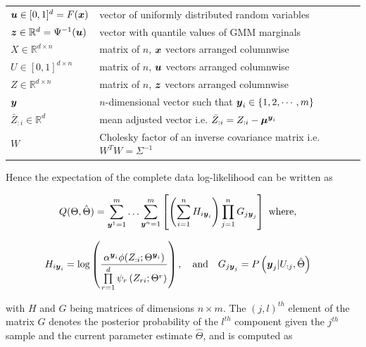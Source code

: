 \documentclass{article}
\begin{document}
\begin{table}[h]
\begin{tabular}{ll}
$\boldsymbol{u} \in [0,1]^d=F(\boldsymbol{x})$ &  vector of uniformly distributed random variables \\

$\boldsymbol{z} \in \mathbb{R}^d =\Psi^{-1}(\boldsymbol{u}) $ &  vector with quantile values of GMM marginals \\

$X \in \mathbb{R}^{d \times n}$ & matrix of $n$, $\boldsymbol{x}$ vectors arranged columnwise \\

$U \in [0,1]^{d \times n}$ & matrix of $n$, $\boldsymbol{u}$ vectors arranged columnwise \\

$Z \in \mathbb{R}^{d \times n}$ & matrix of $n$, $\boldsymbol{z}$ vectors arranged columnwise \\

$\boldsymbol{y}$ & $n$-dimensional vector such that $\boldsymbol{y}_i \in \{1,2,\cdots,m\}$ \\

$\bar{Z}_{:i} \in \mathbb{R}^d$ & mean adjusted vector i.e. $\bar{Z}_{:i} = Z_{:i} - \boldsymbol{\mu}^{\boldsymbol{y}_i}$ \\

$W $ & Cholesky factor of an inverse covariance matrix i.e. $W^TW=\Sigma^{-1}$ \\

 \hline

\end{tabular}

\end{table}

Hence the expectation of the complete data log-likelihood can be written as

\begin{align} \label{eq:ll_comp_expectation}
Q(\Theta,\hat{\Theta})&=\sum\limits_{\boldsymbol{y}^1=1}^m \ldots \sum\limits_{\boldsymbol{y}^n=1}^m \left[ \left( \sum\limits_{i=1}^{n}H_{i\boldsymbol{y}_i}  \right) \prod\limits_{j=1}^{n}G_{j\boldsymbol{y}_j} \right] \text{  where,}
\end{align}

\begin{align}
H_{i\boldsymbol{y}_i} &= \log \left(\frac{\alpha^{\boldsymbol{y}_i}\phi(Z_{:i}; \Theta^{\boldsymbol{y}_i})}{\prod\limits_{r=1}^{d}\psi_{r}\left(Z_{r{i}};\Theta^r \right)} \right),\quad\text{and}\quad
G_{j\boldsymbol{y}_j} = P\left(\boldsymbol{y}_j|U_{:j},\hat{\Theta}\right) \nonumber
\end{align}

with $H$ and $G$ being matrices of dimensions $n\times m$. The $(j,l)^{th}$ element of the matrix $G$ denotes the posterior probability of the $l^{th}$ component given the $j^{th}$ sample and the current parameter estimate $\hat{\Theta}$, and is computed as
\end{document}

